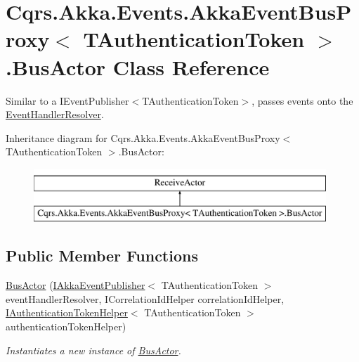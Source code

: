 \hypertarget{classCqrs_1_1Akka_1_1Events_1_1AkkaEventBusProxy_1_1BusActor}{}\section{Cqrs.\+Akka.\+Events.\+Akka\+Event\+Bus\+Proxy$<$ T\+Authentication\+Token $>$.Bus\+Actor Class Reference}
\label{classCqrs_1_1Akka_1_1Events_1_1AkkaEventBusProxy_1_1BusActor}


Similar to a I\+Event\+Publisher$<$\+T\+Authentication\+Token$>$, passes events onto the \hyperlink{classCqrs_1_1Akka_1_1Events_1_1AkkaEventBusProxy_1_1BusActor_ae7986841b1bb97368936c52655b72f96_ae7986841b1bb97368936c52655b72f96}{Event\+Handler\+Resolver}.  


Inheritance diagram for Cqrs.\+Akka.\+Events.\+Akka\+Event\+Bus\+Proxy$<$ T\+Authentication\+Token $>$.Bus\+Actor\+:\begin{figure}[H]
\begin{center}
\leavevmode
\includegraphics[height=2.000000cm]{classCqrs_1_1Akka_1_1Events_1_1AkkaEventBusProxy_1_1BusActor}
\end{center}
\end{figure}
\subsection*{Public Member Functions}
\begin{DoxyCompactItemize}
\item 
\hyperlink{classCqrs_1_1Akka_1_1Events_1_1AkkaEventBusProxy_1_1BusActor_aeb7cebaad75d810375d0adb82848974a_aeb7cebaad75d810375d0adb82848974a}{Bus\+Actor} (\hyperlink{interfaceCqrs_1_1Akka_1_1Events_1_1IAkkaEventPublisher}{I\+Akka\+Event\+Publisher}$<$ T\+Authentication\+Token $>$ event\+Handler\+Resolver, I\+Correlation\+Id\+Helper correlation\+Id\+Helper, \hyperlink{interfaceCqrs_1_1Authentication_1_1IAuthenticationTokenHelper}{I\+Authentication\+Token\+Helper}$<$ T\+Authentication\+Token $>$ authentication\+Token\+Helper)
\begin{DoxyCompactList}\small\item\em Instantiates a new instance of \hyperlink{classCqrs_1_1Akka_1_1Events_1_1AkkaEventBusProxy_1_1BusActor}{Bus\+Actor}. \end{DoxyCompactList}\end{DoxyCompactItemize}
